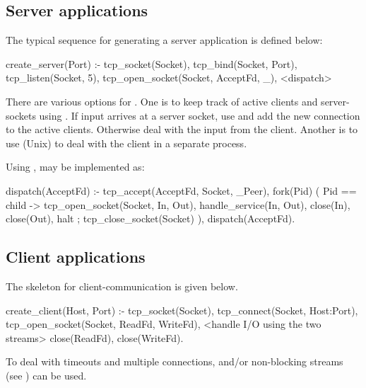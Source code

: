 \documentclass[11pt]{article}
\begin{document}
\subsection{Server applications}

The typical sequence for generating a server application is defined
below:

\begin{code}
create_server(Port) :-
        tcp_socket(Socket),
        tcp_bind(Socket, Port),
        tcp_listen(Socket, 5),
        tcp_open_socket(Socket, AcceptFd, _),
        <dispatch>
\end{code}

\noindent
There are various options for . One is to keep track of active
clients and server-sockets using . If input arrives at a
server socket, use  and add the new connection to the active
clients. Otherwise deal with the input from the client.  Another is
to use (Unix)  to deal with the client in a separate process.

Using ,  may be implemented as:

\begin{code}
dispatch(AcceptFd) :-
        tcp_accept(AcceptFd, Socket, _Peer),
        fork(Pid)
        (   Pid == child
        ->  tcp_open_socket(Socket, In, Out),
            handle_service(In, Out),
            close(In),
            close(Out),
            halt
        ;   tcp_close_socket(Socket)
        ),
        dispatch(AcceptFd).
\end{code}

\noindent
\subsection{Client applications}

The skeleton for client-communication is given below.

\begin{code}
create_client(Host, Port) :-
        tcp_socket(Socket),
        tcp_connect(Socket, Host:Port),
        tcp_open_socket(Socket, ReadFd, WriteFd),
        <handle I/O using the two streams>
        close(ReadFd),
        close(WriteFd).
\end{code}

\noindent
To deal with timeouts and multiple connections,  and/or
non-blocking streams (see ) can be used.
\end{document}
